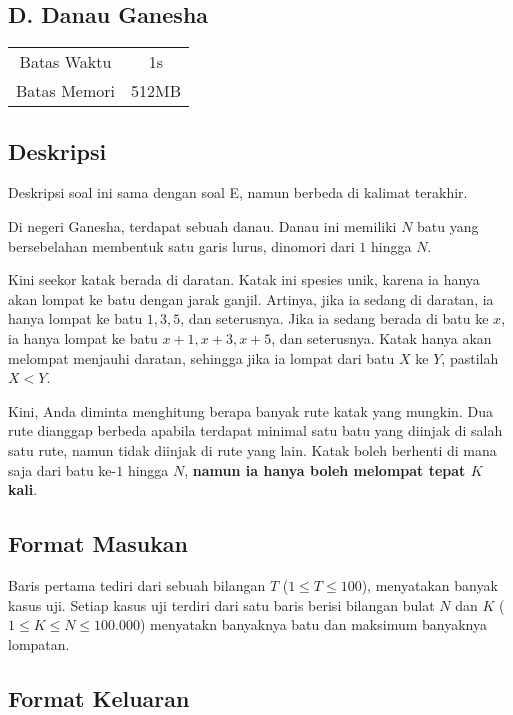 \documentclass{article}
\begin{document}
\begin{center}
    \section*{D. Danau Ganesha}

    \begin{tabular}{ | c c | }
        \hline
        Batas Waktu  & 1s \\
        Batas Memori & 512MB \\
        \hline
    \end{tabular}
\end{center}

\subsection*{Deskripsi}

Deskripsi soal ini sama dengan soal E, namun berbeda di kalimat terakhir.

Di negeri Ganesha, terdapat sebuah danau.
Danau ini memiliki $N$ batu yang bersebelahan membentuk satu garis lurus, dinomori dari $1$ hingga $N$.

Kini seekor katak berada di daratan.
Katak ini spesies unik, karena ia hanya akan lompat ke batu dengan jarak ganjil.
Artinya, jika ia sedang di daratan, ia hanya lompat ke batu $1, 3, 5$, dan seterusnya.
Jika ia sedang berada di batu ke $x$, ia hanya lompat ke batu $x+1, x+3, x+5$, dan seterusnya.
Katak hanya akan melompat menjauhi daratan, sehingga jika ia lompat dari batu $X$ ke $Y$, pastilah $X < Y$.

Kini, Anda diminta menghitung berapa banyak rute katak yang mungkin.
Dua rute dianggap berbeda apabila terdapat minimal satu batu yang diinjak di salah satu rute, namun tidak diinjak di rute yang lain.
Katak boleh berhenti di mana saja dari batu ke-$1$ hingga $N$, \textbf{namun ia hanya boleh melompat tepat $K$ kali}.

\subsection*{Format Masukan}

Baris pertama tediri dari sebuah bilangan $T$ ($1 \leq T \leq 100$), menyatakan banyak kasus uji.
Setiap kasus uji terdiri dari satu baris berisi bilangan bulat $N$ dan $K$ ($1 \leq K \leq N \leq 100.000$) menyatakn banyaknya batu dan maksimum banyaknya lompatan.

\subsection*{Format Keluaran}
\end{document}
